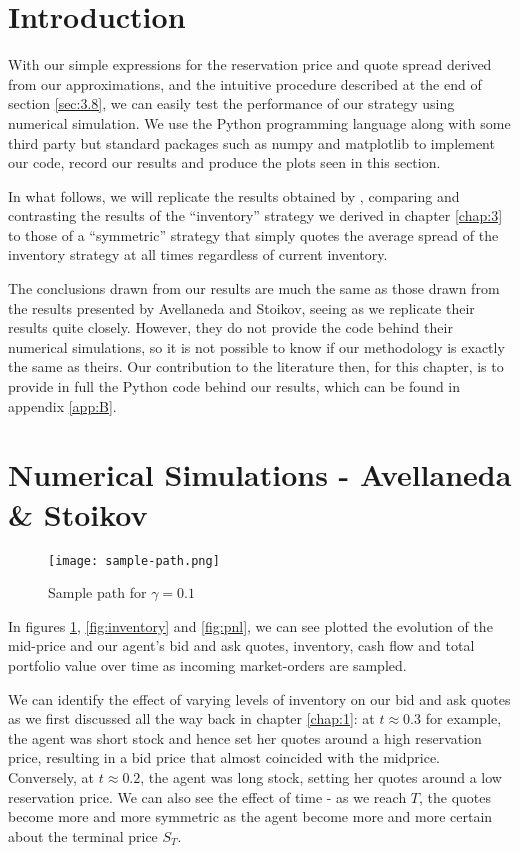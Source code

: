 \section{Introduction}

With our simple expressions for the reservation price and quote
spread derived from our approximations, and the intuitive procedure
described at the end of section \ref{sec:3.8}, we can easily test 
the performance of our strategy using numerical simulation. We use the Python 
programming language along with some third party but standard packages such as 
numpy and matplotlib to implement our code, record our results and produce the 
plots seen in this section. 

In what follows, we will replicate the results obtained 
by \textcite{AS2008}, comparing and contrasting the results of the ``inventory'' strategy
we derived in chapter \ref{chap:3} to those of a ``symmetric'' strategy that simply
quotes the average spread of the inventory strategy at all times regardless of current
inventory. 

The conclusions drawn from our results are much the same as those drawn 
from the results presented by Avellaneda and Stoikov, seeing as we replicate their 
results quite closely. However, they do not provide the code behind their numerical 
simulations, so it is not possible to know if our methodology is exactly the same as 
theirs. Our contribution to the literature then, for this chapter, is to provide in 
full the Python code behind our results, which can be found in appendix \ref{app:B}.

\section{Numerical Simulations - Avellaneda \& Stoikov}

\begin{figure}[ht!]
    \centering
        \texttt{[image: sample-path.png]}
        \caption{Sample path for $\gamma=0.1$}
        \label{fig:sample-paths}
\end{figure}

In figures \ref{fig:sample-paths}, \ref{fig:inventory} and \ref{fig:pnl}, we can see 
plotted the evolution of the mid-price and our agent's bid and ask quotes, inventory,
cash flow and total portfolio value over time as incoming market-orders are sampled.

We can identify the effect of varying levels of inventory on our bid 
and ask quotes as we first discussed all the way back in chapter \ref{chap:1}: at 
$t\approx0.3$ for example, the agent was short stock and hence set her quotes around 
a high reservation price, resulting in a bid price that almost coincided with the 
midprice. Conversely, at $t\approx0.2$, the agent was long stock, setting her quotes 
around a low reservation price. We can also see the effect of time - as we reach $T$, 
the quotes become more and more symmetric as the agent become more and more certain 
about the terminal price $S_T$.

